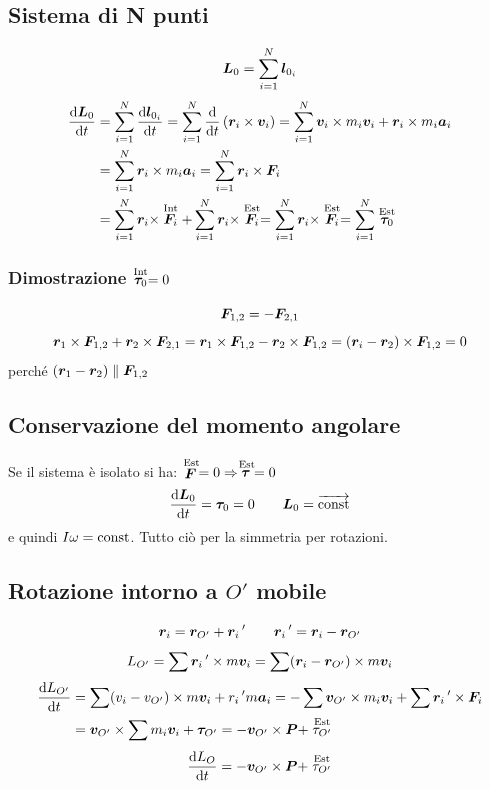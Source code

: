 \subsection{Sistema di N punti}
\begin{equation*}\boldsymbol{L}_0=\sum_{i=1}^N \boldsymbol{l}_{0_i}\end{equation*}
\begin{align*}\frac{\mathrm{d} \boldsymbol{L}_0}{\mathrm{d} t}&=\sum_{i=1}^{N}\frac{\mathrm{d} \boldsymbol{l}_{0_i}}{\mathrm{d}
t}=\sum_{i=1}^{N}\frac{\mathrm{d}}{\mathrm{d} t}\left(\boldsymbol{r}_i \times \boldsymbol{v}_i\right)=\sum_{i=1}^{N}\boldsymbol{v}_i\times m_i \boldsymbol{v}_i+\boldsymbol{r}_i\times m_i\boldsymbol{a}_i\\
&=\sum_{i=1}^{N}\boldsymbol{r}_i\times m_i\boldsymbol{a}_i=\sum_{i=1}^{N}\boldsymbol{r}_i\times\boldsymbol{F}_i\\
&=\sum_{i=1}^{N}\boldsymbol{r}_i\times\stackrel{\text{Int}}{\boldsymbol{F}_i}+\sum_{i=1}^{N}\boldsymbol{r}_i\times\stackrel{\text{Est}}{\boldsymbol{F}_i}=\sum_{i=1}^{N}\boldsymbol{r}_i\times \stackrel{\text{Est}}{\boldsymbol{F}_i}=\sum_{i=1}^{N}\stackrel{\text{Est}}{\boldsymbol{\tau}_0}\end{align*}
\subsubsection{Dimostrazione $\stackrel{\text{Int}}{\boldsymbol{\tau}_0}=0$}
\begin{equation*}\boldsymbol{F}_{1,2}=-\boldsymbol{F}_{2,1}\end{equation*}
\begin{equation*}\boldsymbol{r}_1\times \boldsymbol{F}_{1,2}+\boldsymbol{r}_2\times\boldsymbol{F}_{2,1}=\boldsymbol{r}_1\times \boldsymbol{F}_{1,2}-\boldsymbol{r}_2\times\boldsymbol{F}_{1,2}=\left(\boldsymbol{r}_i-\boldsymbol{r}_2\right)\times\boldsymbol{F}_{1,2}=0\end{equation*}
perché $\left(\boldsymbol{r}_1-\boldsymbol{r}_2\right)\parallel \boldsymbol{F}_{1,2}$
\subsection{Conservazione del momento angolare}
Se il sistema è isolato si ha: $\stackrel{\text{Est}}{\boldsymbol{F}}=0\Rightarrow \stackrel{\text{Est}}{\boldsymbol{\tau}}=0$
$$\frac{\mathrm{d} \boldsymbol{L}_0}{\mathrm{d} t}=\boldsymbol{\tau}_0=0\qquad \boldsymbol{L}_0=\overrightarrow{\text{const}}$$ e quindi
$I\omega={\text{const}}$. Tutto ciò per la simmetria per
rotazioni.
\subsection{Rotazione intorno a $O'$ mobile}
\begin{equation*}\boldsymbol{r}_i=\boldsymbol{r}_{O'}+\boldsymbol{r}_i\,'\qquad \boldsymbol{r}_i\,'=\boldsymbol{r}_i-\boldsymbol{r}_{O'}\end{equation*}
$$L_{O'}=\sum\boldsymbol{r}_i\,'\times m\boldsymbol{v}_i=\sum(\boldsymbol{r}_i-\boldsymbol{r}_{O'})\times m\boldsymbol{v}_i$$
\begin{align*}
\frac{\mathrm{d} L_{O'}}{\mathrm{d} t}&=\sum(v_i-v_{O'})\times m\boldsymbol{v}_i+r_i\,' m\boldsymbol{a}_i=-\sum\boldsymbol{v}_{O'}\times m_i\boldsymbol{v}_i+\sum\boldsymbol{r}_i\,'\times\boldsymbol{F}_i\\
&=\boldsymbol{v}_{O'}\times\sum m_i\boldsymbol{v}_i+\boldsymbol{\tau}_{O'}=-\boldsymbol{v}_{O'}\times\boldsymbol{P}+\stackrel{\text{Est}}{\tau_{O'}}
\end{align*}
\begin{equation*}\frac{\mathrm{d} L_O}{\mathrm{d} t}=-\boldsymbol{v}_{O'}\times\boldsymbol{P}+\stackrel{\text{Est}}{\tau_{O'}}\end{equation*}

